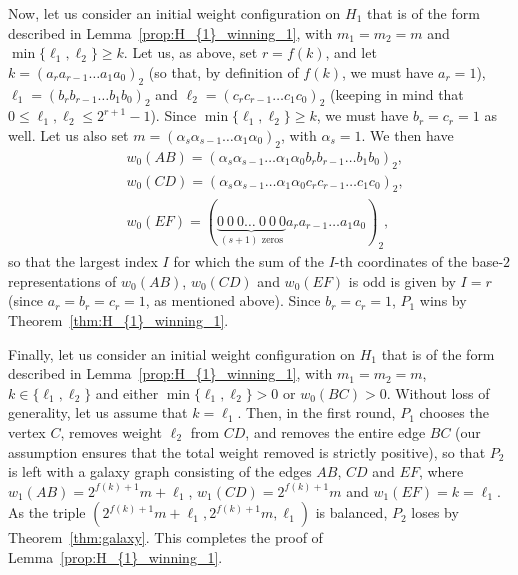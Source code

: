 \documentclass[11pt,reqno]{amsart}
\theoremstyle{definition}
\theoremstyle{definition}
\begin{document}
Now, let us consider an initial weight configuration on $H_{1}$ that is of the form described in Lemma~\ref{prop:H_{1}_winning_1}, with $m_{1}=m_{2}=m$ and $\min\{\ell_{1},\ell_{2}\}\geqslant k$. Let us, as above, set $r=f(k)$, and let $k=(a_{r}a_{r-1}\ldots a_{1}a_{0})_{2}$ (so that, by definition of $f(k)$, we must have $a_{r}=1$), $\ell_{1}=(b_{r}b_{r-1}\ldots b_{1}b_{0})_{2}$ and $\ell_{2}=(c_{r}c_{r-1}\ldots c_{1}c_{0})_{2}$ (keeping in mind that $0 \leqslant \ell_{1}, \ell_{2} \leqslant 2^{r+1}-1$). Since $\min\{\ell_{1},\ell_{2}\}\geqslant k$, we must have $b_{r}=c_{r}=1$ as well. Let us also set $m=(\alpha_{s}\alpha_{s-1}\ldots \alpha_{1}\alpha_{0})_{2}$, with $\alpha_{s}=1$. We then have
\begin{align}
{}&w_{0}(AB)=(\alpha_{s}\alpha_{s-1}\ldots \alpha_{1}\alpha_{0}b_{r}b_{r-1}\ldots b_{1}b_{0})_{2},\nonumber\\
{}&w_{0}(CD)=(\alpha_{s}\alpha_{s-1}\ldots \alpha_{1}\alpha_{0}c_{r}c_{r-1}\ldots c_{1}c_{0})_{2},\nonumber\\
{}&w_{0}(EF)=(\underbrace{0\ 0\ 0 \ldots\ 0\ 0\ 0}_{(s+1) \text{ zeros}}a_{r}a_{r-1}\ldots a_{1}a_{0})_{2},\nonumber
\end{align}
so that the largest index $I$ for which the sum of the $I$-th coordinates of the base-$2$ representations of $w_{0}(AB)$, $w_{0}(CD)$ and $w_{0}(EF)$ is odd is given by $I=r$ (since $a_{r}=b_{r}=c_{r}=1$, as mentioned above). Since $b_{r}=c_{r}=1$, $P_{1}$ wins by Theorem~\ref{thm:H_{1}_winning_1}. 

Finally, let us consider an initial weight configuration on $H_{1}$ that is of the form described in Lemma~\ref{prop:H_{1}_winning_1}, with $m_{1}=m_{2}=m$, $k \in \{\ell_{1},\ell_{2}\}$ and either $\min\{\ell_{1},\ell_{2}\}>0$ or $w_{0}(BC)>0$. Without loss of generality, let us assume that $k=\ell_{1}$. Then, in the first round, $P_{1}$ chooses the vertex $C$, removes weight $\ell_{2}$ from $CD$, and removes the entire edge $BC$ (our assumption ensures that the total weight removed is strictly positive), so that $P_{2}$ is left with a galaxy graph consisting of the edges $AB$, $CD$ and $EF$, where $w_{1}(AB)=2^{f(k)+1}m+\ell_{1}$, $w_{1}(CD)=2^{f(k)+1}m$ and $w_{1}(EF)=k=\ell_{1}$. As the triple $(2^{f(k)+1}m+\ell_{1},2^{f(k)+1}m,\ell_{1})$ is balanced, $P_{2}$ loses by Theorem~\ref{thm:galaxy}. This completes the proof of Lemma~\ref{prop:H_{1}_winning_1}.
\end{document}
